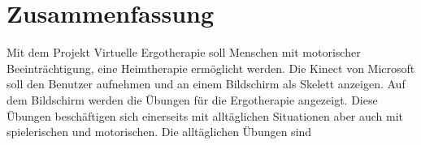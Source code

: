

\chapter*{Zusammenfassung}

Mit dem Projekt Virtuelle Ergotherapie soll Menschen mit motorischer Beeinträchtigung, eine Heimtherapie ermöglicht werden.
Die Kinect von Microsoft soll den Benutzer aufnehmen und an einem Bildschirm als Skelett anzeigen.
Auf dem Bildschirm werden die Übungen für die Ergotherapie angezeigt.
Diese Übungen beschäftigen sich einerseits mit alltäglichen Situationen aber auch mit spielerischen und motorischen.
Die alltäglichen Übungen sind 

